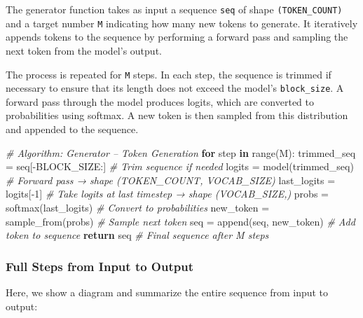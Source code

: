 \documentclass[11pt]{article}
\newenvironment{Shaded}{}{}
\newcommand{\KeywordTok}[1]{\textcolor[rgb]{0.00,0.44,0.13}{\textbf{{#1}}}}
\newcommand{\DecValTok}[1]{\textcolor[rgb]{0.25,0.63,0.44}{{#1}}}
\newcommand{\CommentTok}[1]{\textcolor[rgb]{0.38,0.63,0.69}{\textit{{#1}}}}
\newcommand{\NormalTok}[1]{{#1}}
\newcommand{\ControlFlowTok}[1]{\textcolor[rgb]{0.00,0.44,0.13}{\textbf{{#1}}}}
\newcommand{\OperatorTok}[1]{\textcolor[rgb]{0.40,0.40,0.40}{{#1}}}
\newcommand{\BuiltInTok}[1]{{#1}}
\begin{document}
The generator function takes as input a sequence \texttt{seq} of shape
\texttt{(TOKEN\_COUNT)} and a target number \texttt{M} indicating how
many new tokens to generate. It iteratively appends tokens to the
sequence by performing a forward pass and sampling the next token from
the model's output.

The process is repeated for \texttt{M} steps. In each step, the sequence
is trimmed if necessary to ensure that its length does not exceed the
model's \texttt{block\_size}. A forward pass through the model produces
logits, which are converted to probabilities using softmax. A new token
is then sampled from this distribution and appended to the sequence.

\begin{Shaded}
\begin{Highlighting}[]
\CommentTok{\# Algorithm: Generator – Token Generation}
\ControlFlowTok{for}\NormalTok{ step }\KeywordTok{in} \BuiltInTok{range}\NormalTok{(M):}
\NormalTok{    trimmed\_seq }\OperatorTok{=}\NormalTok{ seq[}\OperatorTok{{-}}\NormalTok{BLOCK\_SIZE:]     }\CommentTok{\# Trim sequence if needed}
\NormalTok{    logits }\OperatorTok{=}\NormalTok{ model(trimmed\_seq)         }\CommentTok{\# Forward pass → shape (TOKEN\_COUNT, VOCAB\_SIZE)}
\NormalTok{    last\_logits }\OperatorTok{=}\NormalTok{ logits[}\OperatorTok{{-}}\DecValTok{1}\NormalTok{]            }\CommentTok{\# Take logits at last timestep → shape (VOCAB\_SIZE,)}
\NormalTok{    probs }\OperatorTok{=}\NormalTok{ softmax(last\_logits)        }\CommentTok{\# Convert to probabilities}
\NormalTok{    new\_token }\OperatorTok{=}\NormalTok{ sample\_from(probs)      }\CommentTok{\# Sample next token}
\NormalTok{    seq }\OperatorTok{=}\NormalTok{ append(seq, new\_token)        }\CommentTok{\# Add token to sequence}
\ControlFlowTok{return}\NormalTok{ seq                              }\CommentTok{\# Final sequence after M steps}
\end{Highlighting}
\end{Shaded}

    \subsubsection{Full Steps from Input to
Output}\label{full-steps-from-input-to-output}

Here, we show a diagram and summarize the entire sequence from input to
output:
\end{document}
